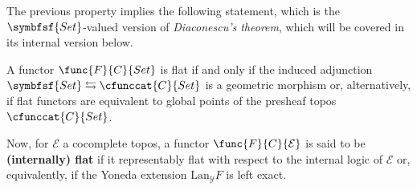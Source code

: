     The previous property implies the following statement, which is the $\symbfsf{Set}$-valued version of \textit{Diaconescu's theorem}, which will be covered in its internal version below.
    \begin{theorem}
        A functor $\func{F}{C}{Set}$ is flat if and only if the induced adjunction $\symbfsf{Set}\leftrightarrows\cfunccat{C}{Set}$ is a geometric morphism or, alternatively, if flat functors are equivalent to global points of the presheaf topos $\cfunccat{C}{Set}$.
    \end{theorem}


    Now, for $\mathcal{E}$ a cocomplete topos, a functor $\func{F}{C}{\mathcal{E}}$ is said to be \textbf{(internally) flat} if it representably flat with respect to the internal logic of $\mathcal{E}$ or, equivalently, if the Yoneda extension $\mathrm{Lan}_{\mathcal{Y}}F$ is left exact.
